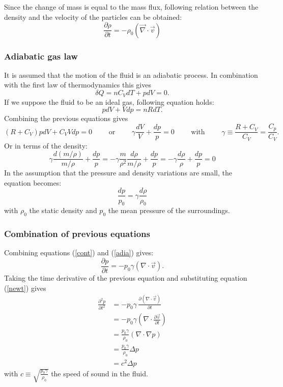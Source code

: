 Since the change of mass is equal to the mass flux, following relation between the density and the velocity of the particles can be obtained:
\begin{equation}
\frac{\partial \rho}{\partial t}  = - \rho_0 (\vec{\nabla} \cdot \vec{v})
\label{cont}
\end{equation}


\subsubsection*{Adiabatic gas law}
\vspace{-15pt}
It is assumed that the motion of the fluid is an adiabatic process. In combination with the first law of thermodynamics this gives
\[
\delta Q = n C_V dT + p dV = 0.
\]
If we suppose the fluid to be an ideal gas, following equation holds:
\[
p dV + V dp = n R dT.
\]
Combining the previous equations gives
\[
(R+ C_V ) p dV + C_V V dp = 0  \qquad \textrm{ or } \qquad \gamma \frac{dV}{V} + \frac{dp}{p} = 0 \qquad \textrm{ with } \qquad \gamma \equiv \frac{R+C_V}{C_V} = \frac{C_p}{C_V}.
\]
Or in terms of the density:
\[
\gamma \frac{d(m/\rho)}{m/ \rho} + \frac{dp}{p} = -\gamma \frac{m}{\rho^2} \frac{d\rho}{m/ \rho} + \frac{dp}{p} =- \gamma \frac{d\rho}{\rho} + \frac{dp}{p} =0
\]
In the assumption that the pressure and density variations are small, the equation becomes:
\begin{equation}
\frac{dp}{p_0} =\gamma \frac{d\rho}{\rho_0}
\label{adia}
\end{equation}
with $\rho_0$ the static density and $p_0$ the mean pressure of the surroundings.





\subsubsection*{Combination of previous equations}
\vspace{-15pt}
Combining equations (\ref{cont}) and (\ref{adia}) gives:
\[
\frac{\partial p}{\partial t} = - p_0 \gamma \left(\nabla \cdot \vec{v}\right).
\]
Taking the time derivative of the previous equation and substituting equation (\ref{newt}) gives
\begin{align*}
\frac{\partial^2 p}{\partial t^2} &= - p_0 \gamma \,\frac{\partial \left(\nabla \cdot \vec{v}\right)}{\partial t}\\
&= - p_0 \gamma \left(\nabla \cdot \frac{\partial \vec{v} }{\partial t}\right)\\
&= \frac{p_0 \gamma}{\rho_0} \left(\nabla \cdot \nabla p\right)\\
&=  \frac{p_0 \gamma}{\rho_0}  \Delta p\\
&= c^2 \Delta p
\end{align*}
with $c\equiv \sqrt{\frac{p_0 \gamma}{\rho_0}}$ the speed of sound in the fluid.







